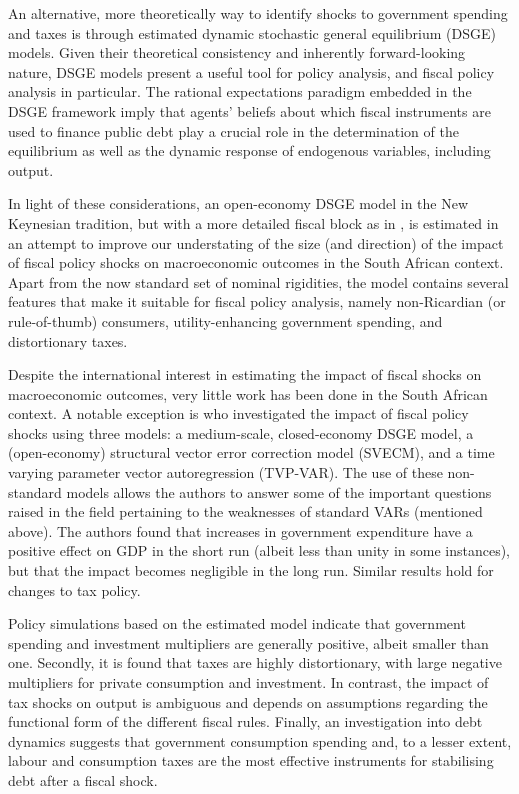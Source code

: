\documentclass[a4paper,11pt]{article}
\numberwithin{equation}{section}
\begin{document}
	An alternative, more theoretically way to identify shocks to government spending and taxes is through estimated dynamic stochastic general equilibrium (DSGE) models. Given their theoretical consistency and inherently forward-looking nature, DSGE models present a useful tool for policy analysis, and fiscal policy analysis in particular. The rational expectations paradigm embedded in the DSGE framework imply that agents' beliefs about which fiscal instruments are used to finance public debt play a crucial role in the determination of the equilibrium as well as the dynamic response of endogenous variables, including output. 
	
	In light of these considerations, an open-economy DSGE model in the New Keynesian tradition, but with a more detailed fiscal block as in \cite{coenen2013}, is estimated in an attempt to improve our understating of the size (and direction) of the impact of fiscal policy shocks on macroeconomic outcomes in the South African context. Apart from the now standard set of nominal rigidities, the model contains several features that make it suitable for fiscal policy analysis, namely non-Ricardian (or rule-of-thumb) consumers, utility-enhancing government spending, and distortionary taxes.
	
	Despite the international interest in estimating the impact of fiscal shocks on macroeconomic outcomes, very little work has been done in the South African context. A notable exception is \cite{jooste} who investigated the impact of fiscal policy shocks using three models: a medium-scale, closed-economy DSGE model, a (open-economy) structural vector error correction model (SVECM), and a time varying parameter vector autoregression (TVP-VAR). The use of these non-standard models allows the authors to answer some of the important questions raised in the field pertaining to the weaknesses of standard VARs (mentioned above). The authors found that increases in government expenditure have a positive effect on GDP in the short run (albeit less than unity in some instances), but that the impact becomes negligible in the long run. Similar results hold for changes to tax policy.
	
	Policy simulations based on the estimated model indicate that government spending and investment multipliers are generally positive, albeit smaller than one. Secondly, it is found that taxes are highly distortionary, with large negative multipliers for private consumption and investment. In contrast, the impact of tax shocks on output is ambiguous and depends on assumptions regarding the functional form of the different fiscal rules. Finally, an investigation into debt dynamics suggests that government consumption spending and, to a lesser extent, labour and consumption taxes are the most effective instruments for stabilising debt after a fiscal shock. 
	
\end{document}
